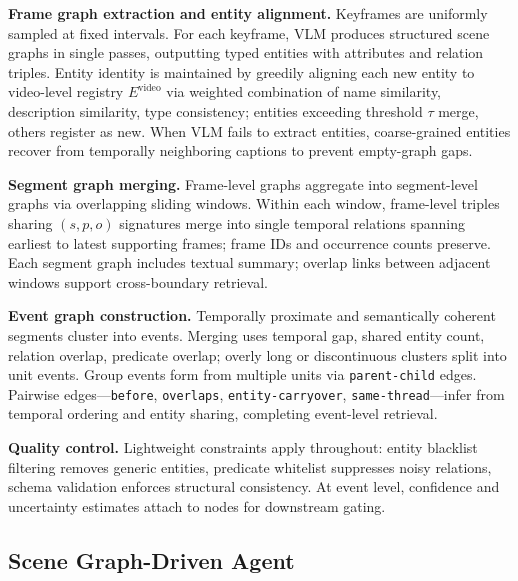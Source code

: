 \documentclass[sigconf, screen, review, anonymous]{acmart}
\begin{document}
\textbf{Frame graph extraction and entity alignment.}
Keyframes are uniformly sampled at fixed intervals.  For each keyframe,
VLM produces structured scene graphs in single passes, outputting typed
entities with attributes and relation triples.  Entity identity is maintained by greedily aligning each new entity to video-level registry $E^{\text{video}}$ via weighted combination of name
similarity, description similarity, type consistency; entities exceeding threshold $\tau$ merge, others register as new. When VLM fails to extract entities, coarse-grained entities
recover from temporally neighboring captions to prevent empty-graph
gaps.

\textbf{Segment graph merging.}
Frame-level graphs aggregate into segment-level graphs via
overlapping sliding windows.  Within each window, frame-level
triples sharing $(s, p, o)$ signatures merge into single
temporal relations spanning earliest to latest supporting
frames; frame IDs and occurrence counts preserve.  Each
segment graph includes textual summary; overlap links
between adjacent windows support cross-boundary retrieval.

\textbf{Event graph construction.}
Temporally proximate and semantically coherent segments cluster into
events.  Merging uses temporal gap, shared entity
count, relation overlap, predicate overlap; overly long or
discontinuous clusters split into unit events.  Group
events form from multiple units via \texttt{parent-child} edges.
Pairwise edges—\texttt{before}, \texttt{overlaps},
\texttt{entity-carryover}, \texttt{same-thread}—infer from
temporal ordering and entity sharing, completing event-level retrieval.

\textbf{Quality control.}
Lightweight constraints apply throughout: entity
blacklist filtering removes generic entities, predicate
whitelist suppresses noisy relations, schema validation
enforces structural consistency.  At event level,
confidence and uncertainty estimates attach to nodes for
downstream gating.


\subsection{Scene Graph-Driven Agent}
\label{sec:agent}
\end{document}

